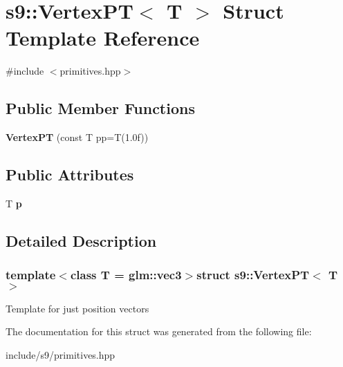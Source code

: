 \hypertarget{structs9_1_1VertexPT}{\section{s9\-:\-:Vertex\-P\-T$<$ T $>$ Struct Template Reference}
\label{structs9_1_1VertexPT}
}


{\ttfamily \#include $<$primitives.\-hpp$>$}

\subsection*{Public Member Functions}
\begin{DoxyCompactItemize}
\item 
\hypertarget{structs9_1_1VertexPT_ab82b6b68abdb878d607802c3a3dd712b}{{\bfseries Vertex\-P\-T} (const T pp=T(1.\-0f))}\label{structs9_1_1VertexPT_ab82b6b68abdb878d607802c3a3dd712b}

\end{DoxyCompactItemize}
\subsection*{Public Attributes}
\begin{DoxyCompactItemize}
\item 
\hypertarget{structs9_1_1VertexPT_ab901fbd71923d60b2165cb893d5e17bb}{T {\bfseries p}}\label{structs9_1_1VertexPT_ab901fbd71923d60b2165cb893d5e17bb}

\end{DoxyCompactItemize}


\subsection{Detailed Description}
\subsubsection*{template$<$class T = glm\-::vec3$>$struct s9\-::\-Vertex\-P\-T$<$ T $>$}

Template for just position vectors 

The documentation for this struct was generated from the following file\-:\begin{DoxyCompactItemize}
\item 
include/s9/primitives.\-hpp\end{DoxyCompactItemize}
